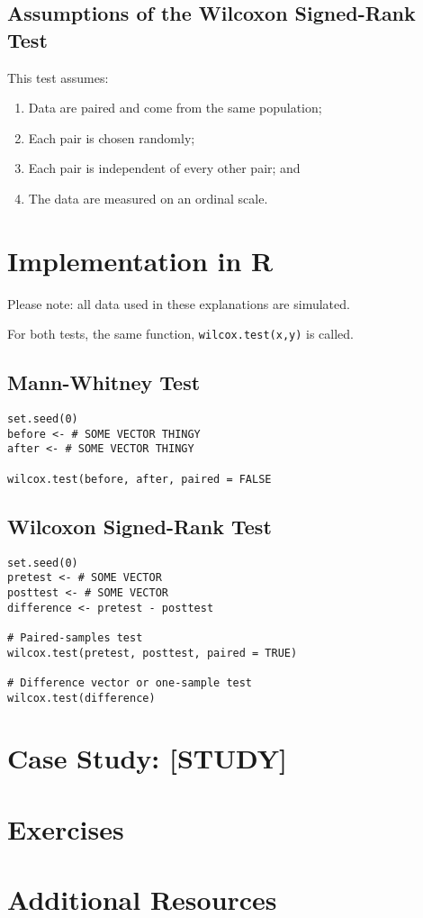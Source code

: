 \subsection{Assumptions  of  the Wilcoxon Signed-Rank Test}

This test assumes:
\begin{enumerate}
\item Data are paired and come from the same population;
\item Each pair is chosen randomly;
\item Each pair is independent of every other pair; and
\item The data are measured on an ordinal scale.
\end{enumerate}

\section{Implementation in R}

Please note: all data used in these explanations are simulated.

For both tests, the same function, \verb|wilcox.test(x,y)| is called.

\subsection{Mann-Whitney Test}

\begin{framed}
\begin{Verbatim}[samepage=TRUE]
set.seed(0)
before <- # SOME VECTOR THINGY
after <- # SOME VECTOR THINGY

wilcox.test(before, after, paired = FALSE
\end{Verbatim}
\end{framed}

\subsection{Wilcoxon Signed-Rank Test}

\begin{framed}
\begin{Verbatim}[samepage=TRUE]
set.seed(0)
pretest <- # SOME VECTOR
posttest <- # SOME VECTOR
difference <- pretest - posttest

# Paired-samples test
wilcox.test(pretest, posttest, paired = TRUE)

# Difference vector or one-sample test
wilcox.test(difference)
\end{Verbatim}
\end{framed}

\section{Case Study: [STUDY]}

\section{Exercises}

\section{Additional Resources}

